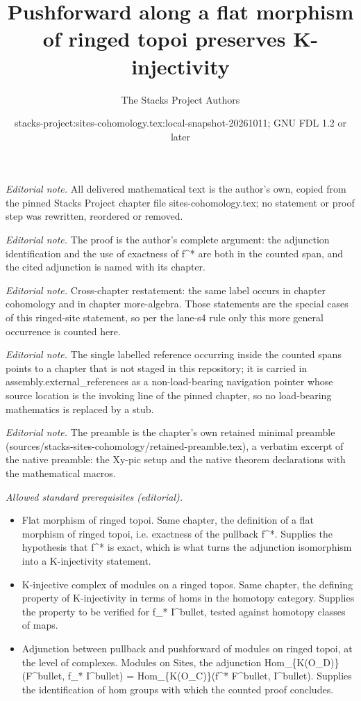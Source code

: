 \documentclass[10pt,a4paper]{amsart}
\title{Pushforward along a flat morphism of ringed topoi preserves K-injectivity}
\author{The Stacks Project Authors}
\date{stacks-project:sites-cohomology.tex:local-snapshot-20261011; GNU FDL 1.2 or later}
\theoremstyle{plain}
\theoremstyle{definition}
\theoremstyle{remark}
\numberwithin{equation}{subsection}
\begin{document}
\maketitle
\noindent\textit{Editorial note.} All delivered mathematical text is the author's own, copied from the pinned Stacks Project chapter file sites-cohomology.tex; no statement or proof step was rewritten, reordered or removed.\par\medskip
\noindent\textit{Editorial note.} The proof is the author's complete argument: the adjunction identification and the use of exactness of f\textasciicircum{}* are both in the counted span, and the cited adjunction is named with its chapter.\par\medskip
\noindent\textit{Editorial note.} Cross-chapter restatement: the same label occurs in chapter cohomology and in chapter more-algebra. Those statements are the special cases of this ringed-site statement, so per the lane-s4 rule only this more general occurrence is counted here.\par\medskip
\noindent\textit{Editorial note.} The single labelled reference occurring inside the counted spans points to a chapter that is not staged in this repository; it is carried in assembly.external\_references as a non-load-bearing navigation pointer whose source location is the invoking line of the pinned chapter, so no load-bearing mathematics is replaced by a stub.\par\medskip
\noindent\textit{Editorial note.} The preamble is the chapter's own retained minimal preamble (sources/stacks-sites-cohomology/retained-preamble.tex), a verbatim excerpt of the native preamble: the Xy-pic setup and the native theorem declarations with the mathematical macros.\par\medskip
\noindent\textit{Allowed standard prerequisites (editorial).}\begin{itemize}
\item Flat morphism of ringed topoi. Same chapter, the definition of a flat morphism of ringed topoi, i.e. exactness of the pullback f\textasciicircum{}*. Supplies the hypothesis that f\textasciicircum{}* is exact, which is what turns the adjunction isomorphism into a K-injectivity statement.
\item K-injective complex of modules on a ringed topos. Same chapter, the defining property of K-injectivity in terms of homs in the homotopy category. Supplies the property to be verified for f\_* I\textasciicircum{}bullet, tested against homotopy classes of maps.
\item Adjunction between pullback and pushforward of modules on ringed topoi, at the level of complexes. Modules on Sites, the adjunction Hom\_\{K(O\_D)\}(F\textasciicircum{}bullet, f\_* I\textasciicircum{}bullet) = Hom\_\{K(O\_C)\}(f\textasciicircum{}* F\textasciicircum{}bullet, I\textasciicircum{}bullet). Supplies the identification of hom groups with which the counted proof concludes.
\end{itemize}\medskip
\end{document}
